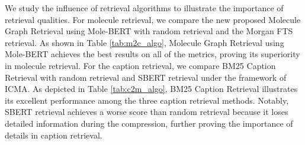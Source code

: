 \begin{table}[htbp]
    \centering
    \vskip -0.1in
    \caption{Performance comparison of different retrieval algorithms for Cap2Mol task (\textbf{Best}, \underline{Second Best}). The backbone is ICMA(Galactica-125M)$_{2,1024}$.}
    \label{tab:c2m_algo}
    \vskip -0.2in
\end{table}
We study the influence of retrieval algorithms to illustrate the importance of retrieval qualities. For molecule retrieval, we compare the new proposed Molecule Graph Retrieval using Mole-BERT with random retrieval and the Morgan FTS retrieval. As shown in Table \ref{tab:m2c_algo},  Molecule Graph Retrieval using Mole-BERT achieves the best results on all of the metrics, proving its superiority in molecule retrieval.
For the caption retrieval, we compare BM25 Caption Retrieval with random retrieval and SBERT retrieval under the framework of ICMA.
As depicted in Table \ref{tab:c2m_algo}, BM25 Caption Retrieval illustrates its excellent performance among the three caption retrieval methods. Notably, SBERT retrieval achieves a worse score than random retrieval because it loses detailed information during the compression, further proving the importance of details in caption retrieval.


